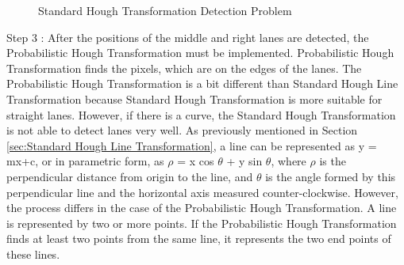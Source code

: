 \begin{figure}[H]
  \centering
  \hfill
  \caption{Standard Hough Transformation Detection Problem}
\end{figure} 


{Step 3 : }After the positions of the middle and right lanes are detected, the Probabilistic Hough Transformation must be implemented. Probabilistic Hough Transformation finds the pixels, which are on the edges of the lanes. The Probabilistic Hough
Transformation is a bit different than Standard Hough Line Transformation because Standard Hough Transformation is more suitable for straight lanes. However, if there is a curve, the Standard Hough Transformation is not able to detect lanes very well. As previously mentioned in Section \ref{sec:Standard Hough Line Transformation}, a line can be represented as y = mx+c, or in parametric form, as $\rho$ = x cos $\theta$ + y sin $\theta$, where $\rho$ is the perpendicular distance from origin to the line, and $\theta$ is the angle formed by this perpendicular line and the horizontal axis measured counter-clockwise. However, the process differs in the case of the Probabilistic Hough Transformation. A line is represented by two or more points. If the Probabilistic Hough Transformation finds at least two points from the same line, it represents the two end points of these lines.

